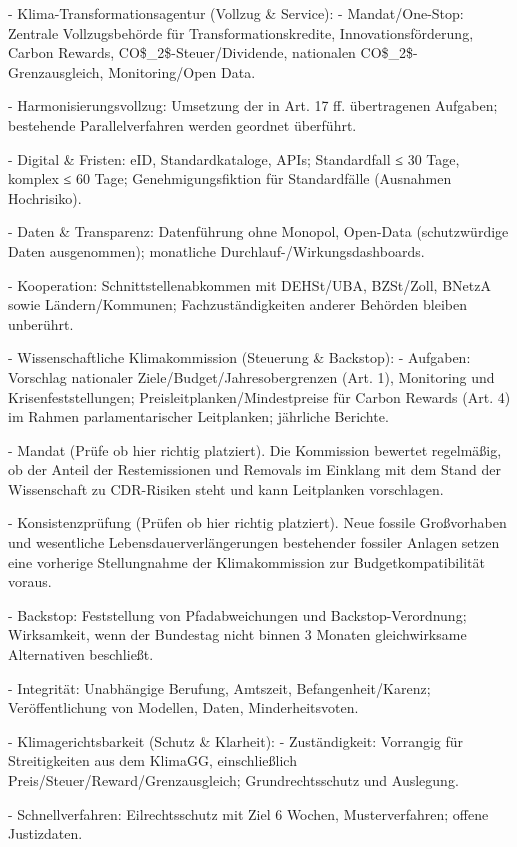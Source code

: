 \documentclass[12pt,a4paper]{scrartcl}
\begin{document}
- Klima-Transformationsagentur (Vollzug \& Service):
- Mandat/One-Stop: Zentrale Vollzugsbehörde für Transformationskredite, Innovationsförderung, Carbon Rewards, CO\$\_2\$-Steuer/Dividende, nationalen CO\$\_2\$-Grenzausgleich, Monitoring/Open Data.

- Harmonisierungsvollzug: Umsetzung der in Art. 17 ff. übertragenen Aufgaben; bestehende Parallelverfahren werden geordnet überführt.

- Digital \& Fristen: eID, Standardkataloge, APIs; Standardfall ≤ 30 Tage, komplex ≤ 60 Tage; Genehmigungsfiktion für Standardfälle (Ausnahmen Hochrisiko).

- Daten \& Transparenz: Datenführung ohne Monopol, Open-Data (schutzwürdige Daten ausgenommen); monatliche Durchlauf-/Wirkungsdashboards.

- Kooperation: Schnittstellenabkommen mit DEHSt/UBA, BZSt/Zoll, BNetzA sowie Ländern/Kommunen; Fachzuständigkeiten anderer Behörden bleiben unberührt.

- Wissenschaftliche Klimakommission (Steuerung \& Backstop):
- Aufgaben: Vorschlag nationaler Ziele/Budget/Jahresobergrenzen (Art. 1), Monitoring und Krisenfeststellungen; Preisleitplanken/Mindestpreise für Carbon Rewards (Art. 4) im Rahmen parlamentarischer Leitplanken; jährliche Berichte.

- Mandat (Prüfe ob hier richtig platziert). Die Kommission bewertet regelmäßig, ob der Anteil der Restemissionen und Removals im Einklang mit dem Stand der Wissenschaft zu CDR-Risiken steht und kann Leitplanken vorschlagen.

- Konsistenzprüfung (Prüfen ob hier richtig platziert). Neue fossile Großvorhaben und wesentliche Lebensdauerverlängerungen bestehender fossiler Anlagen setzen eine vorherige Stellungnahme der Klimakommission zur Budgetkompatibilität voraus.

- Backstop: Feststellung von Pfadabweichungen und Backstop-Verordnung; Wirksamkeit, wenn der Bundestag nicht binnen 3 Monaten gleichwirksame Alternativen beschließt.

- Integrität: Unabhängige Berufung, Amtszeit, Befangenheit/Karenz; Veröffentlichung von Modellen, Daten, Minderheitsvoten.

- Klimagerichtsbarkeit (Schutz \& Klarheit):
- Zuständigkeit: Vorrangig für Streitigkeiten aus dem KlimaGG, einschließlich Preis/Steuer/Reward/Grenzausgleich; Grundrechtsschutz und Auslegung.

- Schnellverfahren: Eilrechtsschutz mit Ziel 6 Wochen, Musterverfahren; offene Justizdaten.
\end{document}
